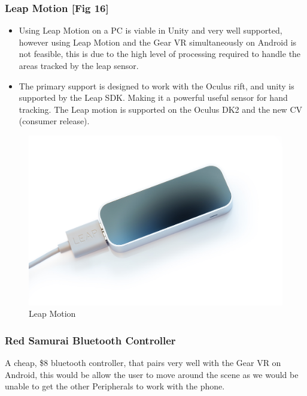 \documentclass[a4paper,10pt]{article}
\begin{document}
\subsubsection{Leap Motion [Fig 16]}
\begin{itemize}
	\item Using Leap Motion on a PC is viable in Unity and very well supported, however using Leap Motion and the Gear VR simultaneously on Android is not feasible, this is due to the high level of processing required to
	handle the areas tracked by the leap sensor. 
	\item The primary support is designed to work with the Oculus rift, and unity is supported by the Leap SDK. Making it a powerful useful sensor for hand tracking. The 
	Leap motion is supported on the Oculus DK2 and the new CV (consumer release). 
\end{itemize}
\begin{figure}[H]
	\centerline{\includegraphics[scale= 0.13]{leap.jpg}}
	\caption{Leap Motion}
	\label{fig:leapImg}
\end{figure}
	
\subsubsection{Red Samurai Bluetooth Controller}
	A cheap, \$8 bluetooth controller, that pairs very well with the Gear VR on Android, this would be allow the user to move around the scene as we would be unable to get the other Peripherals to work with the phone.
	
\end{document}
